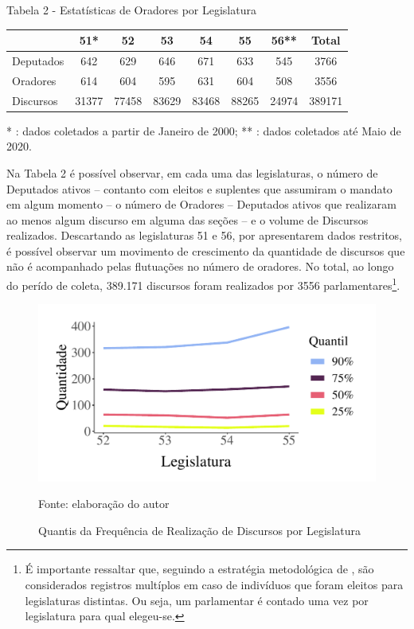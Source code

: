 \documentclass[
12pt,				%
openright,			%
twoside,			%
a4paper,			%
english,			%
french,				%
spanish,			%
brazil				%
]{abntex2}
\begin{document}
\begin{center}
	Tabela 2 - Estatísticas de Oradores por Legislatura
	
	\vspace{0.4cm}
	
	\begin{tabular}{lccccccc}
		\toprule
		{}				& {51*}		& {52} 	& {53}	& {54}	& {55}	& {56**}	& {Total}	\\ \midrule
		{Deputados} 	& 642		& 629	& 646	& 671	& 633	& 545		& 3766		\\ 
		{Oradores} 		& 614		& 604	& 595	& 631	& 604	& 508		& 3556		\\ \midrule
		{Discursos} 	& 31377		& 77458	& 83629	& 83468	& 88265	& 24974		& 389171	\\ 
		\bottomrule
	\end{tabular}
	
	\vspace{0.6cm}
	
	* : dados coletados a partir de Janeiro de 2000; ** : dados coletados até Maio de 2020.
\end{center}

Na Tabela 2 é possível observar, em cada uma das legislaturas, o número de Deputados ativos -- contanto com eleitos e suplentes que assumiram o mandato em algum momento -- o número de Oradores -- Deputados ativos que realizaram ao menos algum discurso em alguma das seções -- e o volume de Discursos realizados. Descartando as legislaturas 51 e 56, por apresentarem dados restritos, é possível observar um movimento de crescimento da quantidade de discursos que não é acompanhado pelas flutuações no número de oradores. No total, ao longo do perído de coleta, 389.171 discursos foram realizados por 3556 parlamentares\footnote{É importante ressaltar que, seguindo a estratégia metodológica de , são considerados registros multíplos em caso de indivíduos que foram eleitos para legislaturas distintas. Ou seja, um parlamentar é contado uma vez por legislatura para qual elegeu-se.}.

\begin{figure}[h]
	\caption{Quantis da Frequência de Realização de Discursos por Legislatura}
	\label{fig:quantis_discursos}
	\centering
	\includegraphics[width=.7\linewidth]{figures/quantis_discursos}
	
	Fonte: elaboração do autor
\end{figure}
\end{document}
